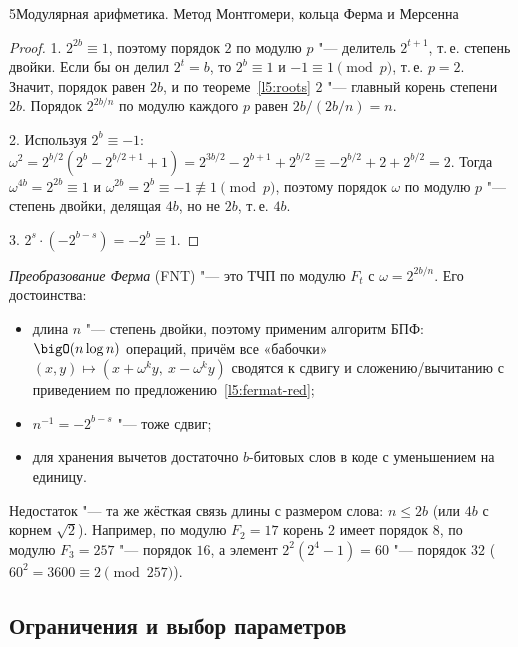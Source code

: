 \begin{lecture}{5}{Модулярная арифметика. Метод Монтгомери, кольца Ферма и Мерсенна}
\begin{proof}
1. $2^{2b} \equiv 1$, поэтому порядок $2$ по модулю $p$ "--- делитель $2^{t+1}$, т.\,е. степень
двойки. Если бы он делил $2^t = b$, то $2^b \equiv 1$ и $-1 \equiv 1 \pmod p$, т.\,е. $p = 2$.
Значит, порядок равен $2b$, и по теореме~\ref{l5:roots} $2$ "--- главный корень степени $2b$.
Порядок $2^{2b/n}$ по модулю каждого $p$ равен $2b / (2b/n) = n$.

2. Используя $2^b \equiv -1$:
$\omega^2 = 2^{b/2}(2^b - 2^{b/2+1} + 1) = 2^{3b/2} - 2^{b+1} + 2^{b/2}
\equiv -2^{b/2} + 2 + 2^{b/2} = 2$. Тогда $\omega^{4b} = 2^{2b} \equiv 1$ и
$\omega^{2b} = 2^b \equiv -1 \not\equiv 1 \pmod p$, поэтому порядок $\omega$ по модулю $p$ "---
степень двойки, делящая $4b$, но не $2b$, т.\,е. $4b$.

3. $2^s \cdot (-2^{b-s}) = -2^b \equiv 1$.
\end{proof}

\emph{Преобразование Ферма} (FNT) "--- это ТЧП по модулю $F_t$ с $\omega = 2^{2b/n}$. Его
достоинства:
\begin{itemize}
  \item длина $n$ "--- степень двойки, поэтому применим алгоритм БПФ: $\bigO(n \log n)$
    операций, причём все «бабочки» $(x, y) \mapsto (x + \omega^k y,\ x - \omega^k y)$ сводятся
    к сдвигу и сложению/вычитанию с приведением по предложению~\ref{l5:fermat-red};
  \item $n^{-1} = -2^{b-s}$ "--- тоже сдвиг;
  \item для хранения вычетов достаточно $b$-битовых слов в коде с уменьшением на единицу.
\end{itemize}
Недостаток "--- та же жёсткая связь длины с размером слова: $n \le 2b$ (или $4b$ с
корнем $\sqrt 2$). Например, по модулю $F_2 = 17$ корень $2$ имеет порядок $8$,
по модулю $F_3 = 257$ "--- порядок $16$, а элемент $2^2(2^4 - 1) = 60$ "--- порядок $32$
($60^2 = 3600 \equiv 2 \pmod{257}$).



\subsection{Ограничения и выбор параметров}


\end{lecture}
